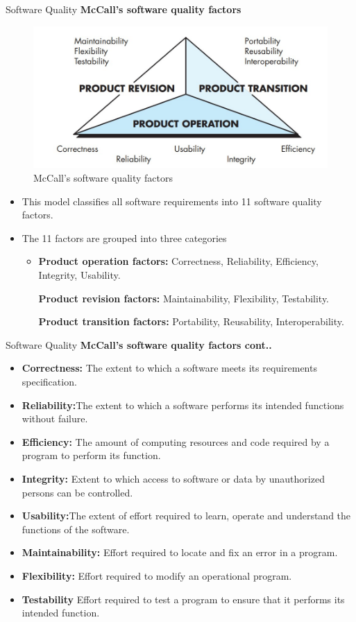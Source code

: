 \documentclass{beamer}
\begin{document}
\begin{frame}{Software Quality}
	\textbf{McCall’s software quality factors }
	\begin{figure}
		\includegraphics[scale=.3]{img/m5_1}
		\caption{McCall’s 
			software 
			quality factors }
	\end{figure}
	\begin{itemize}
		\item This model classifies all software requirements into 11 software quality factors. 
		\item The 11 factors are grouped into three categories
		\begin{itemize}
			\item \textbf{Product operation factors:} Correctness, Reliability, Efficiency, Integrity, Usability.
			
		\textbf{Product revision factors:}  Maintainability, Flexibility, Testability.
			
		\textbf{Product transition factors:} Portability, Reusability, Interoperability.
		\end{itemize}
	\end{itemize}
\end{frame}
\begin{frame}{Software Quality}
	\textbf{McCall’s software quality factors cont.. }
	\begin{itemize}
			\item \textbf{Correctness:} The extent to which a software meets its requirements specification.
		\item \textbf{Reliability:}The extent to which a software performs its intended functions without failure.
	\item \textbf{Efficiency:} The amount of computing resources and code required by a program to perform its function.
		\item \textbf{Integrity:} Extent to which access to software or data by unauthorized persons can be controlled.
		\item \textbf{Usability:}The extent of effort required to learn, operate and understand the functions of the software.
		\item \textbf{Maintainability:} Effort required to locate and fix an error in a program.
		\item \textbf{Flexibility:} Effort required to modify an operational program.
		\item \textbf{Testability} Effort required to test a program to ensure that it performs its intended function.
	\end{itemize}
\end{frame}
\end{document}
